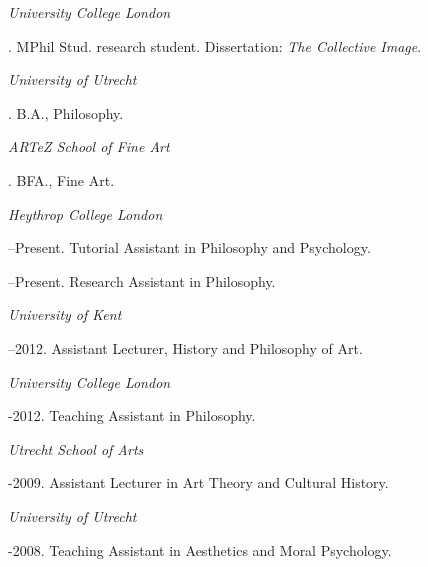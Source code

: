 \documentclass[11pt]{article}
\begin{document}
\noindent\emph{University College London \vspace{0.01in}}


. MPhil Stud. research student. Dissertation: \emph{The Collective Image}. \vspace{-0.1in}

\bigskip

\noindent\emph{University of Utrecht\vspace{0.02in}}

. B.A., Philosophy.

\medskip

\noindent\emph{ARTeZ School of Fine Art\vspace{0.02in}}

. BFA., Fine Art.

\bigskip


\noindent\emph{Heythrop College London \vspace{0.01in}}

--Present. Tutorial Assistant in Philosophy and Psychology.

--Present. Research Assistant in Philosophy.

\medskip

\noindent\emph{University of Kent \vspace{0.01in}}

--2012. Assistant Lecturer, History and Philosophy of Art.

\medskip

\noindent\emph{University College London \vspace{0.01in}}

-2012. Teaching Assistant in Philosophy.

\medskip

\noindent\emph{Utrecht School of Arts \vspace{0.01in}}

-2009. Assistant Lecturer in Art Theory and Cultural History.

\medskip

\noindent\emph{University of Utrecht \vspace{0.01in}}

-2008. Teaching Assistant in Aesthetics and Moral Psychology.

\bigskip

\newpage
\end{document}
